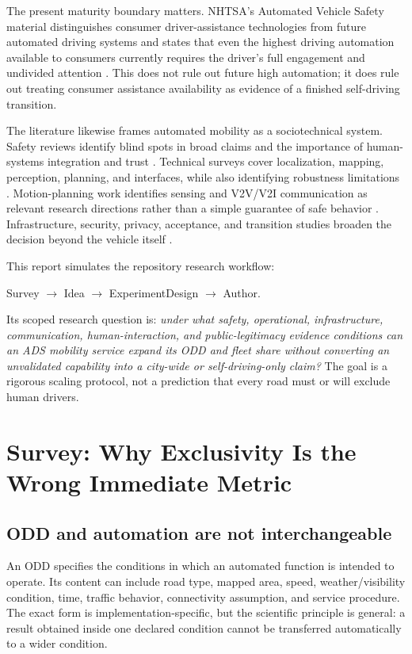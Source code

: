 \documentclass[conference]{../../../../Conference-LaTeX-template_10-17-19/IEEEtran}
\begin{document}
The present maturity boundary matters. NHTSA's Automated Vehicle Safety material distinguishes consumer driver-assistance technologies from future automated driving systems and states that even the highest driving automation available to consumers currently requires the driver's full engagement and undivided attention \cite{nhtsa_av_safety_2026}. This does not rule out future high automation; it does rule out treating consumer assistance availability as evidence of a finished self-driving transition.

The literature likewise frames automated mobility as a sociotechnical system. Safety reviews identify blind spots in broad claims and the importance of human-systems integration and trust \cite{noy_shinar_horrey_2018}. Technical surveys cover localization, mapping, perception, planning, and interfaces, while also identifying robustness limitations \cite{yurtsever_etal_2020}. Motion-planning work identifies sensing and V2V/V2I communication as relevant research directions rather than a simple guarantee of safe behavior \cite{katrakazas_etal_2015}. Infrastructure, security, privacy, acceptance, and transition studies broaden the decision beyond the vehicle itself \cite{tengilimoglu_etal_2023,sadaf_etal_2023,othman_2021,hancock_etal_2019}.

This report simulates the repository research workflow:
\begin{center}
Survey $\rightarrow$ Idea $\rightarrow$ ExperimentDesign $\rightarrow$ Author.
\end{center}
Its scoped research question is: \emph{under what safety, operational, infrastructure, communication, human-interaction, and public-legitimacy evidence conditions can an ADS mobility service expand its ODD and fleet share without converting an unvalidated capability into a city-wide or self-driving-only claim?} The goal is a rigorous scaling protocol, not a prediction that every road must or will exclude human drivers.

\section{Survey: Why Exclusivity Is the Wrong Immediate Metric}
\subsection{ODD and automation are not interchangeable}
An ODD specifies the conditions in which an automated function is intended to operate. Its content can include road type, mapped area, speed, weather/visibility condition, time, traffic behavior, connectivity assumption, and service procedure. The exact form is implementation-specific, but the scientific principle is general: a result obtained inside one declared condition cannot be transferred automatically to a wider condition.
\end{document}
